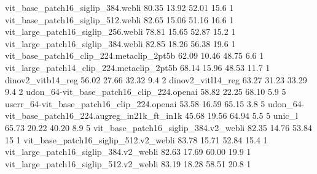 {vit_base_patch16_siglip_384.webli	80.35	13.92	52.01	15.6	1
vit_base_patch16_siglip_512.webli	82.65	15.06	51.16	16.6	1
vit_large_patch16_siglip_256.webli	78.81	15.65	52.87	15.2	1
vit_large_patch16_siglip_384.webli	82.85	18.26	56.38	19.6	1
vit_base_patch16_clip_224.metaclip_2pt5b	62.09	10.46	48.75	6.6	1
vit_large_patch14_clip_224.metaclip_2pt5b	68.14	15.96	48.53	11.7	1
dinov2_vitb14_reg	56.02	27.66	32.32	9.4	2
dinov2_vitl14_reg	63.27	31.23	33.29	9.4	2
udon_64-vit_base_patch16_clip_224.openai	58.82	22.25	68.10	5.9	5
uscrr_64-vit_base_patch16_clip_224.openai	53.58	16.59	65.15	3.8	5
udon_64-vit_base_patch16_224.augreg_in21k_ft_in1k	45.68	19.56	64.94	5.5 5
unic_l	65.73	20.22	40.20	8.9	5
vit_base_patch16_siglip_384.v2_webli	82.35	14.76	53.84	15	1
vit_base_patch16_siglip_512.v2_webli	83.78	15.71	52.84	15.4	1
vit_large_patch16_siglip_384.v2_webli	82.63	17.69	60.00	19.9	1
vit_large_patch16_siglip_512.v2_webli	83.19	18.28	58.51	20.8	1
}{\instregldsop}